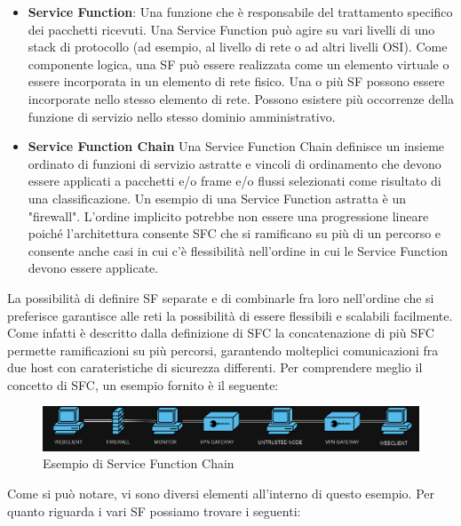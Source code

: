 \begin{itemize}
    \item \textbf{Service Function}: Una funzione che è responsabile del trattamento specifico dei pacchetti ricevuti. Una Service Function può agire su vari livelli di uno stack di protocollo (ad esempio, al livello di rete o ad altri livelli OSI). 
    Come componente logica, una SF può essere realizzata come un elemento virtuale o essere incorporata in un elemento di rete fisico.
     Una o più SF possono essere incorporate nello stesso elemento di rete. Possono esistere più occorrenze della funzione di servizio nello stesso dominio amministrativo.
    \item \textbf{Service Function Chain} Una Service Function Chain definisce un insieme ordinato di funzioni di servizio astratte e vincoli di ordinamento che devono essere applicati a pacchetti e/o frame e/o flussi selezionati come risultato di una classificazione. 
    Un esempio di una Service Function astratta è un "firewall". 
    L'ordine implicito potrebbe non essere una progressione lineare poiché l'architettura consente SFC che si ramificano su più di un percorso e consente anche casi in cui c'è flessibilità nell'ordine in cui le Service Function devono essere applicate. 
\end{itemize}

La possibilità di definire SF separate e di combinarle fra loro nell'ordine che si preferisce garantisce alle reti la possibilità di essere flessibili e scalabili facilmente.
Come infatti è descritto dalla definizione di SFC la concatenazione di più SFC permette ramificazioni su più percorsi, garantendo molteplici comunicazioni fra due host con carateristiche di sicurezza differenti.
Per comprendere meglio il concetto di SFC, un esempio fornito è il seguente:


\begin{figure}[h]  %
    \centering
    \includegraphics[width=1\textwidth]{SFC.png}  %
    \caption{Esempio di Service Function Chain}
    \label{fig:esempio}
  \end{figure}


Come si può notare, vi sono diversi elementi all'interno di questo esempio.
Per quanto riguarda i vari SF possiamo trovare i seguenti:

